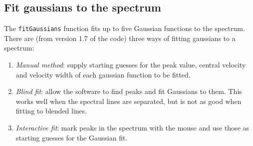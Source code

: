 \documentclass[11pt,a4paper]{article}
\begin{document}
\subsection{Fit gaussians to the spectrum}
\label{sec:fit-gauss-spectr}

The \texttt{fitGaussians} function fits up to five Gaussian functions
to the spectrum. There are (from version 1.7 of the code) three ways of
fitting gaussians to a spectrum:
\begin{enumerate}
\item \emph{Manual method}: supply starting guesses for the peak value,
  central velocity and
  velocity width of each gaussian function to be fitted. 
\item \emph{Blind fit}: allow the software to find peaks and fit
  Gaussians to them. This works well when the spectral lines are
  separated, but is not as good when fitting to blended lines.
\item \emph{Interactive fit}: mark peaks in the spectrum with the
  mouse and use those as starting guesses for the Gaussian fit. 
\end{enumerate}
\end{document}
